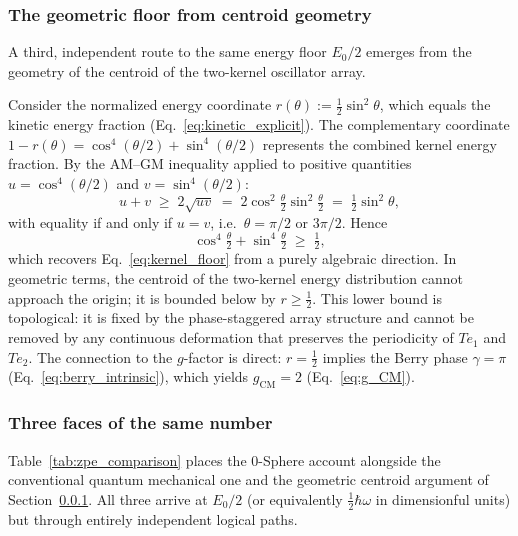 \documentclass[%
 reprint,
 amsmath,amssymb,
 aps,
 prb,
]{revtex4-2}
\numberwithin{equation}{section}
\theoremstyle{definition}
\theoremstyle{remark}
\begin{document}
\subsubsection{The geometric floor from centroid geometry}
\label{subsec:centroid}

A third, independent route to the same energy floor $E_0/2$ emerges from the geometry of the centroid of the two-kernel oscillator array.

Consider the normalized energy coordinate $r(\theta) := \frac{1}{2}\sin^2\!\theta$, which equals the kinetic energy fraction (Eq.~\ref{eq:kinetic_explicit}). The complementary coordinate $1 - r(\theta) = \cos^4(\theta/2) + \sin^4(\theta/2)$ represents the combined kernel energy fraction. By the AM--GM inequality applied to positive quantities $u = \cos^4(\theta/2)$ and $v = \sin^4(\theta/2)$:
\begin{equation}
u + v \;\geq\; 2\sqrt{uv} \;=\; 2\cos^2\!\tfrac{\theta}{2}\sin^2\!\tfrac{\theta}{2}
\;=\; \tfrac{1}{2}\sin^2\!\theta,
\end{equation}
with equality if and only if $u = v$, i.e.\ $\theta = \pi/2$ or $3\pi/2$. Hence
\begin{equation}
\cos^4\!\tfrac{\theta}{2} + \sin^4\!\tfrac{\theta}{2} \;\geq\; \tfrac{1}{2},
\end{equation}
which recovers Eq.~\eqref{eq:kernel_floor} from a purely algebraic direction. In geometric terms, the centroid of the two-kernel energy distribution cannot approach the origin; it is bounded below by $r \geq \tfrac{1}{2}$. This lower bound is topological: it is fixed by the phase-staggered array structure and cannot be removed by any continuous deformation that preserves the periodicity of $Te_1$ and $Te_2$. The connection to the $g$-factor is direct: $r = \tfrac{1}{2}$ implies the Berry phase $\gamma = \pi$ (Eq.~\ref{eq:berry_intrinsic}), which yields $g_{\text{CM}} = 2$ (Eq.~\ref{eq:g_CM}).

\subsubsection{Three faces of the same number}

Table~\ref{tab:zpe_comparison} places the 0-Sphere account alongside the conventional quantum mechanical one and the geometric centroid argument of Section~\ref{subsec:centroid}. All three arrive at $E_0/2$ (or equivalently $\frac{1}{2}\hbar\omega$ in dimensionful units) but through entirely independent logical paths.
\end{document}
